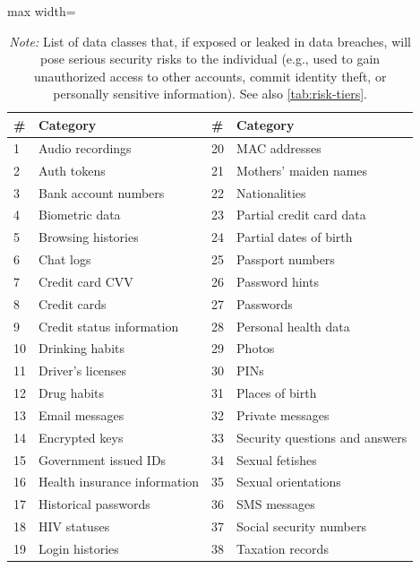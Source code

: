 \documentclass[12pt, letterpaper]{article}
\begin{document}
\begin{table}
\captionsetup{justification=centering} %
\centering
\footnotesize
\caption{Classification of the 38 Serious Data Classes in Breaches}
\label{tab:serious_dataclasses}
\begin{adjustbox}{max width=\linewidth}
\begin{tabular}{llll}
    \toprule\toprule
    \textbf{\#} & \textbf{Category} & \textbf{\#} & \textbf{Category} \\
    \midrule
    1  & Audio recordings & 20 & MAC addresses  \\ 
    2  & Auth tokens & 21 & Mothers' maiden names  \\ 
    3  & Bank account numbers & 22 & Nationalities  \\ 
    4  & Biometric data & 23 & Partial credit card data  \\ 
    5  & Browsing histories & 24 & Partial dates of birth  \\ 
    6  & Chat logs & 25 & Passport numbers  \\ 
    7  & Credit card CVV & 26 & Password hints  \\ 
    8  & Credit cards & 27 & Passwords  \\ 
    9  & Credit status information & 28 & Personal health data  \\ 
    10 & Drinking habits & 29 & Photos  \\ 
    11 & Driver's licenses & 30 & PINs  \\ 
    12 & Drug habits & 31 & Places of birth  \\ 
    13 & Email messages & 32 & Private messages  \\ 
    14 & Encrypted keys & 33 & Security questions and answers  \\ 
    15 & Government issued IDs & 34 & Sexual fetishes  \\ 
    16 & Health insurance information & 35 & Sexual orientations  \\ 
    17 & Historical passwords & 36 & SMS messages  \\ 
    18 & HIV statuses & 37 & Social security numbers  \\ 
    19 & Login histories & 38 & Taxation records  \\ 
    \bottomrule
\end{tabular}
\end{adjustbox}
\caption*{\footnotesize 
    \emph{Note:} List of data classes that, if exposed or leaked in data breaches, will pose serious security risks to the individual (e.g., used to gain unauthorized access to other accounts, commit identity theft, or personally sensitive information).
    See also \cref{tab:risk-tiers}.
}
\end{table}
\end{document}
